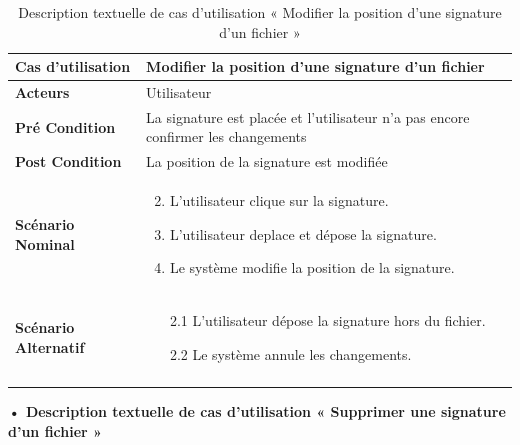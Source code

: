 \begin{longtable}{|p{5cm}|p{10cm}|}
\hline
\textbf{Cas d'utilisation}&Modifier la position d'une signature d'un fichier\\
\hline
\textbf{Acteurs}&Utilisateur\\
\hline
\textbf{Pré Condition}&La signature est placée et l'utilisateur n'a pas encore confirmer les changements\\
\hline
\textbf{Post Condition}&La position de la signature est modifiée\\
\hline
\textbf{Scénario Nominal}&
\vspace{-\baselineskip}
\begin{enumerate}
    \setcounter{enumi}{1}
    \item L'utilisateur clique sur la signature.
    \item L'utilisateur deplace et dépose la signature.
    \item Le système modifie la position de la signature.
\end{enumerate}\\
\hline
\textbf{Scénario Alternatif}&
\vspace{-\baselineskip}
\begin{enumerate}
    \item [2.1]L'utilisateur dépose la signature hors du fichier.
    \item [2.2]Le système annule les changements.
\end{enumerate}\\
\hline
\caption{Description textuelle de cas d'utilisation « Modifier la position d'une signature d'un fichier »}
\label{tab:description-textuelle-de-cas-d-utilisation-modifier-la-position-d-une-signature-d-un-fichier}
\end{longtable}

\textbf{•	Description textuelle de cas d'utilisation « Supprimer une signature d'un fichier  »}

